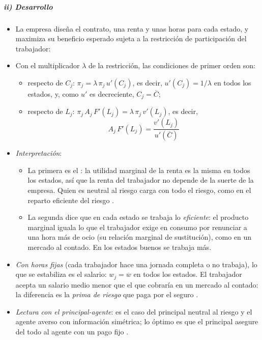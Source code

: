\documentclass[11pt]{article}
\begin{document}
\subparagraph{ii) Desarrollo}

\begin{itemize}
\item La empresa diseña el contrato, una renta y unas horas para cada estado, y maximiza su beneficio esperado sujeta a la restricción de participación del trabajador:
\item Con el multiplicador $\lambda$ de la restricción, las condiciones de primer orden son:
  \begin{itemize}
  \item respecto de $C_j$: $\pi_j=\lambda\,\pi_j\,u'(C_j)$, es decir, $u'(C_j)=1/\lambda$ en todos los estados, y, como $u'$ es decreciente, $C_j=\overline{C}$;
  \item respecto de $L_j$: $\pi_j\,A_j\,F'(L_j)=\lambda\,\pi_j\,v'(L_j)$, es decir,
    \begin{equation}
    A_j\,F'(L_j)=\frac{v'(L_j)}{u'(\overline{C})} \label{eq:empleo-eficiente}
    \end{equation}
  \end{itemize}
\item \emph{Interpretación}:
  \begin{itemize}
  \item La primera es el : la utilidad marginal de la renta es la misma en todos los estados, así que la renta del trabajador no depende de la suerte de la empresa. Quien es neutral al riesgo carga con todo el riesgo, como en el reparto eficiente del riesgo .
  \item La segunda dice que en cada estado se trabaja lo \emph{eficiente}: el producto marginal iguala lo que el trabajador exige en consumo por renunciar a una hora más de ocio (su relación marginal de sustitución), como en un mercado al contado. En los estados buenos se trabaja más.
  \end{itemize}
\item \emph{Con horas fijas} (cada trabajador hace una jornada completa o no trabaja), lo que se estabiliza es el salario: $w_j=\overline{w}$ en todos los estados. El trabajador acepta un salario medio menor que el que cobraría en un mercado al contado: la diferencia es la \emph{prima de riesgo} que paga por el seguro .
\item \emph{Lectura con el principal-agente}: es el caso del principal neutral al riesgo y el agente averso con información simétrica; lo óptimo es que el principal asegure del todo al agente con un pago fijo .
\end{itemize}
\end{document}
